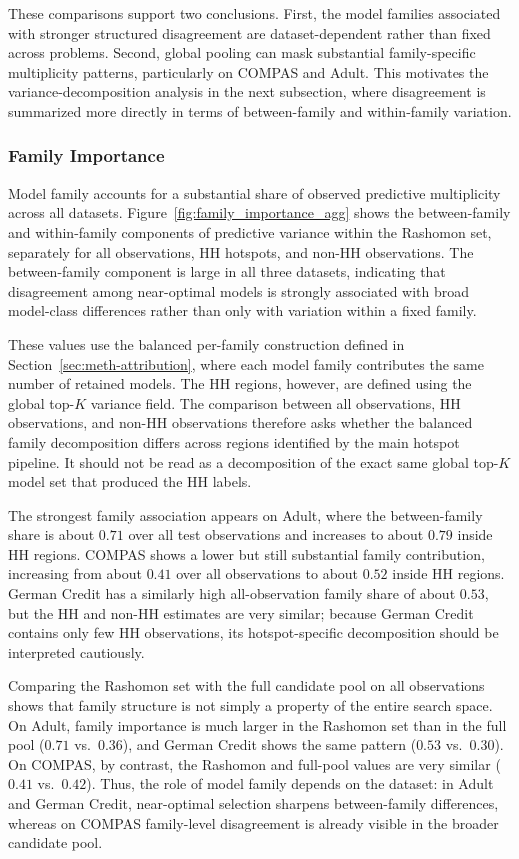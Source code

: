 These comparisons support two conclusions. First, the model families
associated with stronger structured disagreement are dataset-dependent rather than fixed
across problems. Second, global pooling can mask substantial family-specific multiplicity
patterns, particularly on COMPAS and Adult. This motivates the variance-decomposition
analysis in the next subsection, where disagreement is summarized more directly in terms
of between-family and within-family variation.

\subsubsection{Family Importance}

Model family accounts for a substantial share of observed predictive multiplicity across
all datasets. Figure~\ref{fig:family_importance_agg} shows the between-family and
within-family components of predictive variance within the Rashomon set, separately for
all observations, HH hotspots, and non-HH observations. The between-family component
is large in all three datasets, indicating that disagreement among near-optimal models is
strongly associated with broad model-class differences rather than only with variation
within a fixed family.

These values use the balanced per-family construction defined in Section~\ref{sec:meth-attribution},
where each model family contributes the same number of retained models. The HH regions,
however, are defined using the global top-$K$ variance field. The comparison between all
observations, HH observations, and non-HH observations therefore asks whether the
balanced family decomposition differs across regions identified by the main hotspot
pipeline. It should not be read as a decomposition of the exact same global top-$K$ model
set that produced the HH labels.

The strongest family association appears on Adult, where the between-family share is
about $0.71$ over all test observations and increases to about $0.79$ inside HH regions.
COMPAS shows a lower but still substantial family contribution, increasing from about
$0.41$ over all observations to about $0.52$ inside HH regions. German Credit has a
similarly high all-observation family share of about $0.53$, but the HH and non-HH
estimates are very similar; because German Credit contains only few HH observations,
its hotspot-specific decomposition should be interpreted cautiously.

Comparing the Rashomon set with the full candidate pool on all observations shows that
family structure is not simply a property of the entire search space. On Adult, family
importance is much larger in the Rashomon set than in the full pool ($0.71$ vs.\ $0.36$),
and German Credit shows the same pattern ($0.53$ vs.\ $0.30$). On COMPAS, by
contrast, the Rashomon and full-pool values are very similar ($0.41$ vs.\ $0.42$). Thus,
the role of model family depends on the dataset: in Adult and German Credit,
near-optimal selection sharpens between-family differences, whereas on COMPAS
family-level disagreement is already visible in the broader candidate pool.

